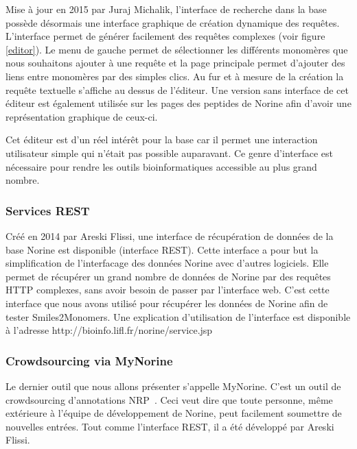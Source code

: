 Mise à jour en 2015 par Juraj Michalik, l'interface de recherche dans la base possède désormais une interface graphique de création dynamique des requêtes.
L'interface permet de générer facilement des requêtes complexes (voir figure \ref{editor}).
Le menu de gauche permet de sélectionner les différents monomères que nous souhaitons ajouter à une requête et la page principale permet d'ajouter des liens entre monomères par des simples clics.
Au fur et à mesure de la création la requête textuelle s'affiche au dessus de l'éditeur.
Une version sans interface de cet éditeur est également utilisée sur les pages des peptides de Norine afin d'avoir une représentation graphique de ceux-ci.

Cet éditeur est d'un réel intérêt pour la base car il permet une interaction utilisateur simple qui n'était pas possible auparavant.
Ce genre d'interface est nécessaire pour rendre les outils bioinformatiques accessible au plus grand nombre.



\subsubsection{Services REST}

Créé en 2014 par Areski Flissi, une interface de récupération de données de la base Norine est disponible (interface REST).
Cette interface a pour but la simplification de l'interfacage des données Norine avec d'autres logiciels.
Elle permet de récupérer un grand nombre de données de Norine par des requêtes HTTP complexes, sans avoir besoin de passer par l'interface web.
C'est cette interface que nous avons utilisé pour récupérer les données de Norine afin de tester Smiles2Monomers.
Une explication d'utilisation de l'interface est disponible à l'adresse http://bioinfo.lifl.fr/norine/service.jsp



\subsubsection{Crowdsourcing via MyNorine}

Le dernier outil que nous allons présenter s'appelle MyNorine.
C'est un outil de crowdsourcing d'annotations NRP~\cite{flissi_norine_2016}.
Ceci veut dire que toute personne, même extérieure à l'équipe de développement de Norine, peut facilement soumettre de nouvelles entrées.
Tout comme l'interface REST, il a été développé par Areski Flissi.

